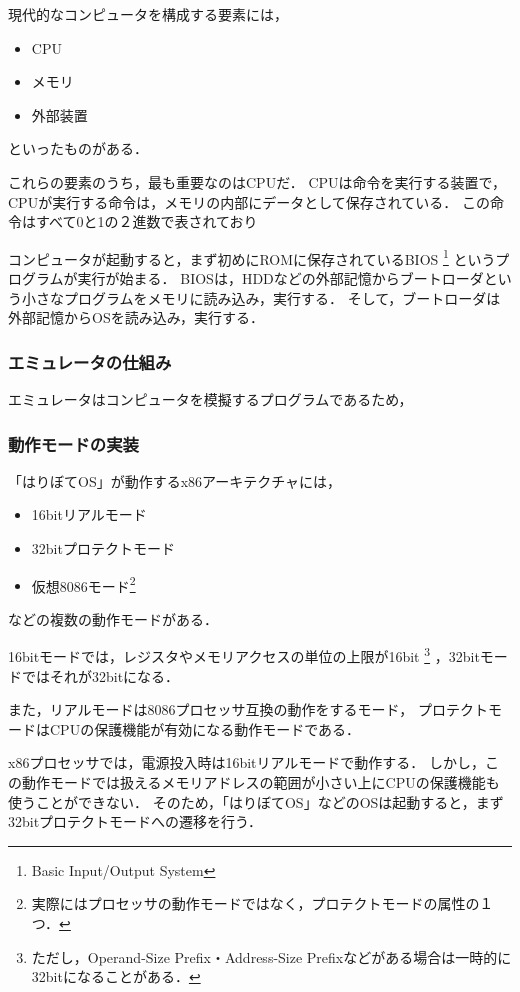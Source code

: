 \documentclass[10pt,a4j]{jsarticle}
\begin{document}
現代的なコンピュータを構成する要素には，
\begin{itemize}
	\item CPU
	\item メモリ
	\item 外部装置
\end{itemize}
といったものがある．

これらの要素のうち，最も重要なのはCPUだ．
CPUは命令を実行する装置で，
CPUが実行する命令は，メモリの内部にデータとして保存されている．
この命令はすべて0と1の２進数で表されており

コンピュータが起動すると，まず初めにROMに保存されているBIOS
\footnote{Basic Input/Output System}
というプログラムが実行が始まる．
BIOSは，HDDなどの外部記憶からブートローダという小さなプログラムをメモリに読み込み，実行する．
そして，ブートローダは外部記憶からOSを読み込み，実行する．

\subsubsection{エミュレータの仕組み}
エミュレータはコンピュータを模擬するプログラムであるため，



\subsubsection{動作モードの実装}
「はりぼてOS」が動作するx86アーキテクチャには，
\begin{itemize}
	\item 16bitリアルモード
	\item 32bitプロテクトモード
	\item 仮想8086モード\footnote{実際にはプロセッサの動作モードではなく，プロテクトモードの属性の１つ．}
\end{itemize}
などの複数の動作モードがある．

16bitモードでは，レジスタやメモリアクセスの単位の上限が16bit
\footnote{ただし，Operand-Size Prefix・Address-Size Prefixなどがある場合は一時的に32bitになることがある．}
，32bitモードではそれが32bitになる．

また，リアルモードは8086プロセッサ互換の動作をするモード，
プロテクトモードはCPUの保護機能が有効になる動作モードである．

x86プロセッサでは，電源投入時は16bitリアルモードで動作する．
しかし，この動作モードでは扱えるメモリアドレスの範囲が小さい上にCPUの保護機能も使うことができない．
そのため，「はりぼてOS」などのOSは起動すると，まず32bitプロテクトモードへの遷移を行う．
\end{document}
